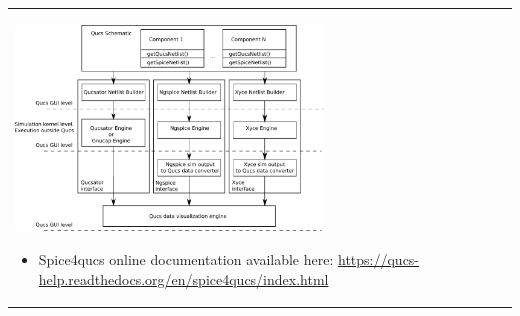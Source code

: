 \documentclass[9pt]{beamer}
\begin{document}
\begin{frame}
\begin{tabular}{p{}p{}}
\includegraphics[width=0.65\textwidth]{img/spice4qucs.pdf} 
     \begin{itemize}
      \item Spice4qucs online documentation available here: 
\url{https://qucs-help.readthedocs.org/en/spice4qucs/index.html}
     \end{itemize} \\

  
  \end{tabular} 

 
\end{frame}
\end{document}
